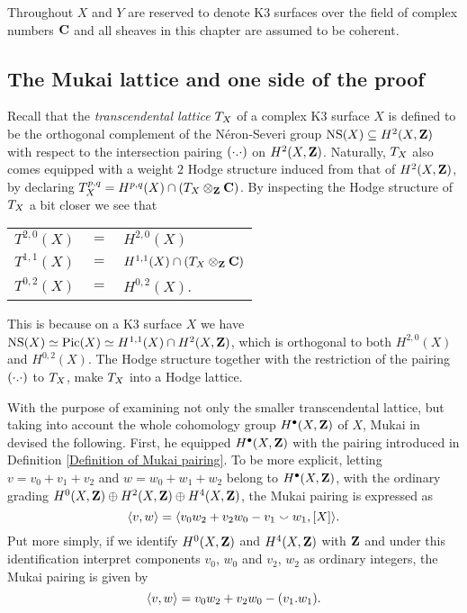 \noindent
Throughout $X$ and $Y$ are reserved to denote K3 surfaces over the field of complex numbers $\mathbf C$ and all sheaves in this chapter are assumed to be coherent.

\subsection{The Mukai lattice and one side of the proof}

Recall that the \emph{transcendental lattice} $T_{X}$ of a complex K3 surface $X$ is defined to be the orthogonal complement of the Néron-Severi group $\operatorname{NS}(X) \subseteq H^{2}(X, \mathbf Z)$ with respect to the intersection pairing $(\cdot.\cdot)$ on $H^{2}(X, \mathbf Z)$.
Naturally, $T_{X}$ also comes equipped with a weight $2$ Hodge structure induced from that of $H^{2}(X, \mathbf Z)$, by declaring $T_{X}^{p,q} = H^{p,q}(X) \cap (T_{X} \otimes_\mathbf Z \mathbf C)$. By inspecting the Hodge structure of $T_{X}$ a bit closer we see that
\begin{center}
    \begin{tabular}{r c l}
        $T^{2,0}(X)$ & $=$ & $H^{2,0}(X)$ \\
        $T^{1,1}(X)$ & $=$ & $H^{1,1}(X) \cap (T_{X} \otimes_\mathbf Z \mathbf C)$ \\
        $T^{0,2}(X)$ & $=$ & $H^{0,2}(X)$.
    \end{tabular}
\end{center}
This is because on a K3 surface $X$ we have $\operatorname{NS}(X) \simeq \operatorname{Pic}(X) \simeq H^{1,1}(X) \cap H^2(X, \mathbf Z)$, which is orthogonal to both $H^{2,0}(X)$ and $H^{0,2}(X)$.
The Hodge structure together with the restriction of the pairing $(\cdot.\cdot)$ to $T_{X}$, make $T_{X}$ into a Hodge lattice.


With the purpose of examining not only the smaller transcendental lattice, but taking into account the whole cohomology group $H^{\bullet}(X, \mathbf Z)$ of $X$, Mukai in \cite[]{Mukai1987} devised the following. First, he equipped $H^{\bullet}(X, \mathbf Z)$ with the pairing introduced in Definition \ref{Definition of Mukai pairing}. To be more explicit, letting $v = v_0 + v_1 + v_2$ and $w = w_0 + w_1 + w_2$ belong to $H^{\bullet}(X, \mathbf Z)$, with the ordinary grading $H^{0}(X, \mathbf Z) \oplus H^{2}(X, \mathbf Z) \oplus H^{4}(X, \mathbf Z)$, the Mukai pairing is expressed as
\[
    \langle v, w \rangle = \langle v_0w_2 + v_2w_0 - v_1 \smallsmile w_1, [X] \rangle.
\]
Put more simply, if we identify $H^{0}(X, \mathbf Z)$ and $H^{4}(X, \mathbf Z)$ with $\mathbf Z$ and under this identification interpret components $v_0$, $w_0$ and $v_2$, $w_2$ as ordinary integers, the Mukai pairing is given by
\[
    \langle v, w \rangle = v_0w_2 + v_2w_0 - (v_1.w_1).
\] 

